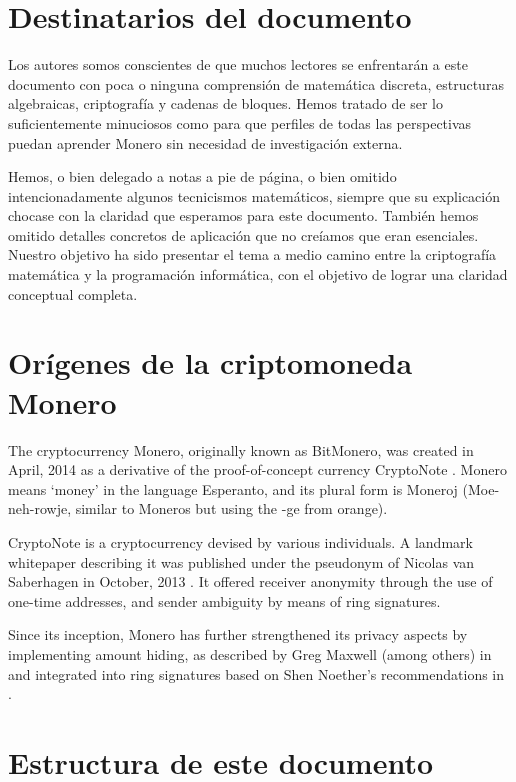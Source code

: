 \section{Destinatarios del documento}

Los autores somos conscientes de que muchos lectores se enfrentarán a este documento con poca o ninguna comprensión de matemática discreta, estructuras algebraicas, criptografía y cadenas de bloques. Hemos tratado de ser lo suficientemente minuciosos como para que perfiles de todas las perspectivas puedan aprender Monero sin necesidad de investigación externa.

Hemos, o bien delegado a notas a pie de página, o bien omitido intencionadamente algunos tecnicismos matemáticos, siempre que su explicación chocase con la claridad que esperamos para este documento. También hemos omitido detalles concretos de aplicación que no creíamos que eran esenciales. Nuestro objetivo ha sido presentar el tema a medio camino entre la criptografía matemática y la programación informática, con el objetivo de lograr una claridad conceptual completa.


\section{Orígenes de la criptomoneda Monero}

The cryptocurrency Monero, originally known as BitMonero, was created in April, 2014 as a derivative of the proof-of-concept currency CryptoNote \cite{bitmonero-launched}. Monero means `money' in the language Esperanto, and its plural form is Moneroj (Moe-neh-rowje, similar to Moneros but using the -ge from orange).

CryptoNote is a cryptocurrency devised by various individuals. A landmark whitepaper describing it was published under the pseudonym of Nicolas van Saberhagen in October, 2013 \cite{cryptoNoteWhitePaper}. It offered receiver anonymity through the use of one-time addresses, and sender ambiguity by means of ring signatures.

Since its inception, Monero has further strengthened its privacy aspects by implementing amount hiding, as described by Greg Maxwell (among others) in \cite{Signatures2015BorromeanRS} and integrated into ring signatures based on Shen Noether's recommendations in \cite{MRL-0005}.
  

\section{Estructura de este documento}


